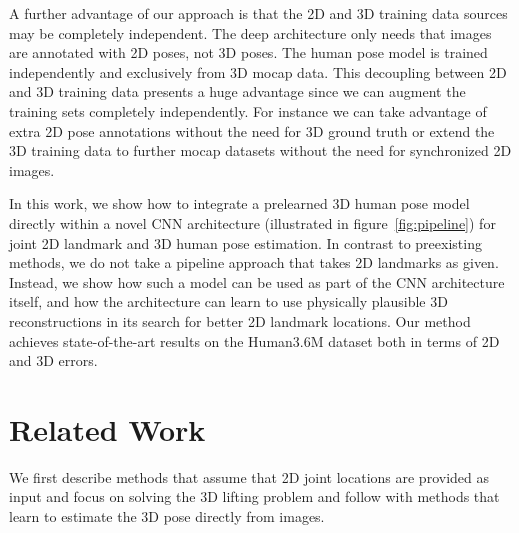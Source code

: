 \documentclass[10pt,twocolumn,letterpaper]{article}
\begin{document}
A further advantage of our approach is that the  2D and 3D training
data sources may be completely independent. The  deep
architecture only needs that images are annotated with 2D poses, not
3D poses. The human pose model is trained independently and
exclusively from 3D mocap data. This decoupling between 2D and 3D
training data presents a huge advantage since we can augment the 
training sets completely independently. For instance we can take
advantage of extra 2D pose annotations without the need for 3D ground
truth or extend the 3D training data to further mocap datasets without
the need for synchronized 2D images.

 In this work, we show how to integrate a
prelearned 3D human pose model directly within a novel CNN architecture
 (illustrated in figure~\ref{fig:pipeline}) for joint 2D landmark
and 3D human pose estimation. In contrast to preexisting methods, we
do not take a pipeline approach that takes 2D landmarks as
given. Instead, we show how such a model can be used as part of the
CNN architecture itself, and how the architecture can learn to use
physically plausible 3D reconstructions in its search for better 2D
landmark locations. Our method achieves state-of-the-art results on
the Human3.6M dataset both in terms of 2D and 3D errors.




\section{Related Work}
%
We first describe methods that assume that 2D joint
locations are provided as input and focus on solving the 3D lifting
problem and follow with methods that learn to estimate the 3D pose
directly from images.
\end{document}

